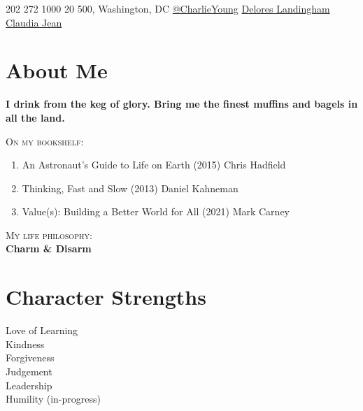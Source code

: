 \documentclass{rmjCV}
\begin{document}
\vspace{0.15cm}
\vspace{0.15cm}

 {202 272 1000} {20 500, Washington, DC} {\href{https://twitter.com} {\faTwitter \hspace{0.1cm}@CharlieYoung}} {\href{https://github.com}{\faGithub \hspace{0.1cm}Delores Landingham}} {\href{https://www.linkedin.com}{\faLinkedin \hspace{0.1cm}Claudia Jean}}

\setlength{\columnsep}{0.5cm}

\begin{paracol}{2}

\begin{leftcolumn}
	\section{About Me}
\textbf{I drink from the keg of glory. Bring me the finest muffins and bagels in all the land.} %


\noindent \textsc{On my bookshelf:}
\begin{enumerate}
	\item An Astronaut's Guide to Life on Earth (2015) Chris Hadfield
	\item Thinking, Fast and Slow (2013) Daniel Kahneman
	\item Value(s): Building a Better World for All (2021) Mark Carney
\end{enumerate}

\noindent \textsc{My life philosophy:}\\
\textbf{Charm \& Disarm}

	\section{Character Strengths}
Love of Learning\\
Kindness\\
Forgiveness\\
Judgement\\
Leadership\\
Humility (in-progress)


\end{leftcolumn}
\end{paracol}
\end{document}
